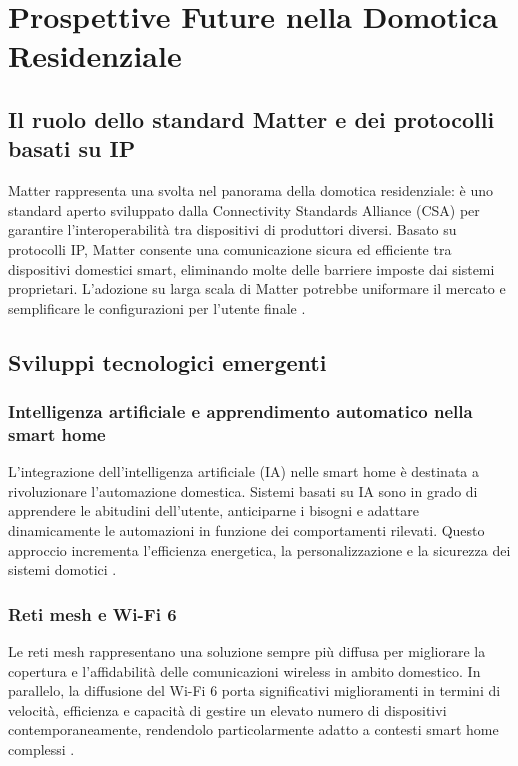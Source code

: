 \chapter{Prospettive Future nella Domotica Residenziale}
\section{Il ruolo dello standard Matter e dei protocolli basati su IP}
Matter rappresenta una svolta nel panorama della domotica residenziale: è uno standard aperto sviluppato dalla Connectivity Standards Alliance (CSA) per garantire l'interoperabilità tra dispositivi di produttori diversi. Basato su protocolli IP, Matter consente una comunicazione sicura ed efficiente tra dispositivi domestici smart, eliminando molte delle barriere imposte dai sistemi proprietari. L'adozione su larga scala di Matter potrebbe uniformare il mercato e semplificare le configurazioni per l'utente finale \parencite{matterCSA}.

\section{Sviluppi tecnologici emergenti}

\subsection{Intelligenza artificiale e apprendimento automatico nella smart home}
L'integrazione dell'intelligenza artificiale (IA) nelle smart home è destinata a rivoluzionare l'automazione domestica. Sistemi basati su IA sono in grado di apprendere le abitudini dell'utente, anticiparne i bisogni e adattare dinamicamente le automazioni in funzione dei comportamenti rilevati. Questo approccio incrementa l'efficienza energetica, la personalizzazione e la sicurezza dei sistemi domotici \parencite{ieeeAI}.

\subsection{Reti mesh e Wi-Fi 6}
Le reti mesh rappresentano una soluzione sempre più diffusa per migliorare la copertura e l'affidabilità delle comunicazioni wireless in ambito domestico. In parallelo, la diffusione del Wi-Fi 6 porta significativi miglioramenti in termini di velocità, efficienza e capacità di gestire un elevato numero di dispositivi contemporaneamente, rendendolo particolarmente adatto a contesti smart home complessi \parencite{etsiWifi6}.

